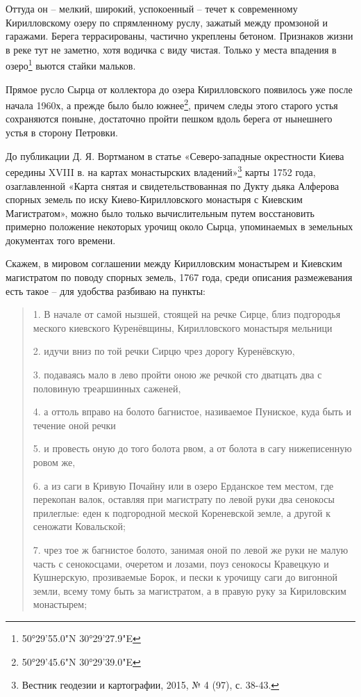 Оттуда он – мелкий, широкий, успокоенный – течет к современному Кирилловскому озеру по спрямленному руслу, зажатый между промзоной и гаражами. Берега террасированы, частично укреплены бетоном. Признаков жизни в реке тут не заметно, хотя водичка с виду чистая. Только у места впадения в озеро\footnote{50°29'55.0"N 30°29'27.9"E} вьются стайки мальков.

Прямое русло Сырца от коллектора до озера Кирилловского появилось уже после начала 1960х, а прежде было было южнее\footnote{50°29'45.6"N 30°29'39.0"E}, причем следы этого старого устья сохраняются поныне, достаточно пройти пешком вдоль берега от нынешнего устья в сторону Петровки.




До публикации Д. Я. Вортманом в статье «Северо-западные окрестности Киева середины XVIII в. на картах монастырских владений»\footnote{Вестник геодезии и картографии, 2015, № 4 (97), с. 38-43.} карты 1752 года, озаглавленной «Карта снятая и свидетельствованная по Дукту дьяка Алферова спорных земель по иску Киево-Кирилловского монастыря с Киевским Магистратом», можно было только вычислительным путем восстановить примерно положение некоторых урочищ около Сырца, упоминаемых в земельных документах того времени.

Скажем, в мировом соглашении между  Кирилловским монастырем и Киевским магистратом по поводу спорных земель, 1767 года, среди описания размежевания есть такое – для удобства разбиваю на пункты:

\begin{quotation}
1. В начале от самой нызшей, стоящей на речке Сирце, близ подгородья меского киевского Куренёвщины, Кирилловского монастыря мельници 

2. идучи вниз по той речки Сирцю чрез дорогу Куренёвскую, 

3. подаваясь мало в лево пройти оною же речкой сто дватцать два с половиную треаршинных саженей, 

4. а оттоль вправо на болото багнистое, називаемое Пуниское, куда быть и течение оной речки 

5. и провесть оную до того болота рвом, а от болота в сагу нижеписенную ровом же,

6. а из саги в Кривую Почайну или в озеро Ерданское тем местом, где перекопан валок, оставляя при магистрату по левой руки два сенокосы прилеглые: еден к подгородной меской Кореневской земле, а другой к сеножати Ковальской;

7. чрез тое ж багнистое болото, занимая оной по левой же руки не малую часть с сенокосцами, очеретом и лозами, поуз сенокосы Кравецкую и Кушнерскую, прозиваемые Борок, и пески к урочищу саги до вигонной земли, всему тому быть за магистратом, а в правую руку за Кириловским монастырем; 
\end{quotation}

